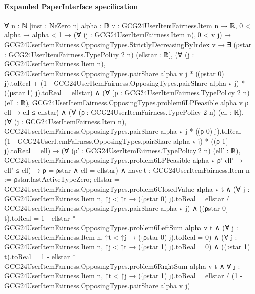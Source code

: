 \documentclass[10pt]{article}
\begin{document}
\paragraph{Expanded PaperInterface specification}
\begin{ReviewVerbatim}
∀ {n : ℕ} [inst : NeZero n] {alpha : ℝ} {v : GCG24UserItemFairness.Item n → ℝ},
  0 < alpha →
    alpha < 1 →
      (∀ (j : GCG24UserItemFairness.Item n), 0 < v j) →
        GCG24UserItemFairness.OpposingTypes.StrictlyDecreasingByIndex v →
          ∃ (ρstar : GCG24UserItemFairness.TypePolicy 2 n) (ellstar : ℝ),
            (∀ (j : GCG24UserItemFairness.Item n),
                GCG24UserItemFairness.OpposingTypes.pairShare alpha v j * ((ρstar 0) j).toReal +
                    (1 - GCG24UserItemFairness.OpposingTypes.pairShare alpha v j) * ((ρstar 1) j).toReal =
                  ellstar) ∧
              (∀ (ρ : GCG24UserItemFairness.TypePolicy 2 n) (ell : ℝ),
                  GCG24UserItemFairness.OpposingTypes.problem6LPFeasible alpha v ρ ell → ell ≤ ellstar) ∧
                (∀ (ρ : GCG24UserItemFairness.TypePolicy 2 n) (ell : ℝ),
                    (∀ (j : GCG24UserItemFairness.Item n),
                        GCG24UserItemFairness.OpposingTypes.pairShare alpha v j * ((ρ 0) j).toReal +
                            (1 - GCG24UserItemFairness.OpposingTypes.pairShare alpha v j) * ((ρ 1) j).toReal =
                          ell) →
                      (∀ (ρ' : GCG24UserItemFairness.TypePolicy 2 n) (ell' : ℝ),
                          GCG24UserItemFairness.OpposingTypes.problem6LPFeasible alpha v ρ' ell' → ell' ≤ ell) →
                        ρ = ρstar ∧ ell = ellstar) ∧
                  have t : GCG24UserItemFairness.Item n := ρstar.lastActiveTypeZero;
                  ellstar = GCG24UserItemFairness.OpposingTypes.problem6ClosedValue alpha v t ∧
                    (∀ {j : GCG24UserItemFairness.Item n},
                        ↑j < ↑t →
                          ((ρstar 0) j).toReal = ellstar / GCG24UserItemFairness.OpposingTypes.pairShare alpha v j) ∧
                      ((ρstar 0) t).toReal =
                          1 - ellstar * GCG24UserItemFairness.OpposingTypes.problem6LeftSum alpha v t ∧
                        (∀ {j : GCG24UserItemFairness.Item n}, ↑t < ↑j → ((ρstar 0) j).toReal = 0) ∧
                          (∀ {j : GCG24UserItemFairness.Item n}, ↑j < ↑t → ((ρstar 1) j).toReal = 0) ∧
                            ((ρstar 1) t).toReal =
                                1 - ellstar * GCG24UserItemFairness.OpposingTypes.problem6RightSum alpha v t ∧
                              ∀ {j : GCG24UserItemFairness.Item n},
                                ↑t < ↑j →
                                  ((ρstar 1) j).toReal =
                                    ellstar / (1 - GCG24UserItemFairness.OpposingTypes.pairShare alpha v j)
\end{ReviewVerbatim}
\end{document}
